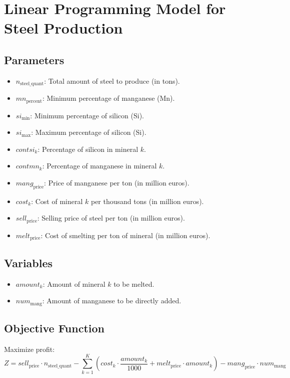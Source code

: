 \documentclass{article}
\begin{document}
\section*{Linear Programming Model for Steel Production}

\subsection*{Parameters}
\begin{itemize}
    \item \( n_{\text{steel\_quant}} \): Total amount of steel to produce (in tons).
    \item \( mn_{\text{percent}} \): Minimum percentage of manganese (Mn).
    \item \( si_{\text{min}} \): Minimum percentage of silicon (Si).
    \item \( si_{\text{max}} \): Maximum percentage of silicon (Si).
    \item \( contsi_k \): Percentage of silicon in mineral \( k \).
    \item \( contmn_k \): Percentage of manganese in mineral \( k \).
    \item \( mang_{\text{price}} \): Price of manganese per ton (in million euros).
    \item \( cost_k \): Cost of mineral \( k \) per thousand tons (in million euros).
    \item \( sell_{\text{price}} \): Selling price of steel per ton (in million euros).
    \item \( melt_{\text{price}} \): Cost of smelting per ton of mineral (in million euros).
\end{itemize}

\subsection*{Variables}
\begin{itemize}
    \item \( amount_k \): Amount of mineral \( k \) to be melted.
    \item \( num_{\text{mang}} \): Amount of manganese to be directly added.
\end{itemize}

\subsection*{Objective Function}
Maximize profit:
\[
Z = sell_{\text{price}} \cdot n_{\text{steel\_quant}} - \sum_{k=1}^{K} (cost_k \cdot \frac{amount_k}{1000} + melt_{\text{price}} \cdot amount_k) - mang_{\text{price}} \cdot num_{\text{mang}}
\]
\end{document}
